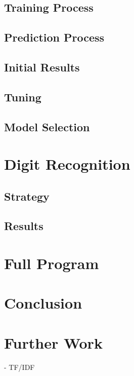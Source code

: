 \documentclass[11pt]{article}
\begin{document}
\subsection{Training Process}
\subsection{Prediction Process}
\subsection{Initial Results}
\subsection{Tuning}
\subsection{Model Selection}
\section{Digit Recognition}
\subsection{Strategy}
\subsection{Results}
\section{Full Program}
\section{Conclusion}
\section{Further Work}
- TF/IDF
\end{document}
